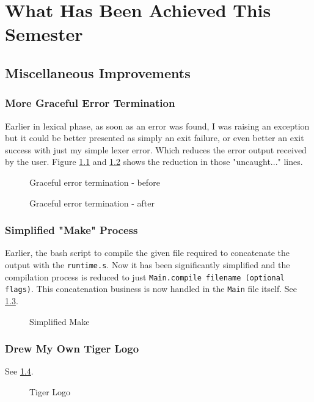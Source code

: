 \chapter{What Has Been Achieved This Semester}

\section{Miscellaneous Improvements}

\subsection{More Graceful Error Termination}

Earlier in lexical phase, as soon as an error was found, I was raising an exception but it could be better presented as simply an exit failure, or even better an exit success with just my simple lexer error. Which reduces the error output received by the user. Figure \ref{fig:gr1} and \ref{fig:gr2} shows the reduction in those "uncaught..." lines.

\begin{figure}
	\centering
	\caption{Graceful error termination - before}
	\label{fig:gr1}
\end{figure}
\begin{figure}
	\centering
	\caption{Graceful error termination - after}
	\label{fig:gr2}
\end{figure}

\subsection{Simplified "Make" Process}

Earlier, the bash script to compile the given file required to concatenate the output with the \texttt{runtime.s}. Now it has been significantly simplified and the compilation process is reduced to just \texttt{Main.compile filename (optional flags)}. This concatenation business is now handled in the \texttt{Main} file itself. See \ref{fig:sm}.

\begin{figure}
	\centering
	\caption{Simplified Make}
	\label{fig:sm}
\end{figure}

\subsection{Drew My Own Tiger Logo}
See \ref{fig:tig}.
\begin{figure}
	\centering
	\caption{Tiger Logo}
	\label{fig:tig}
\end{figure}

